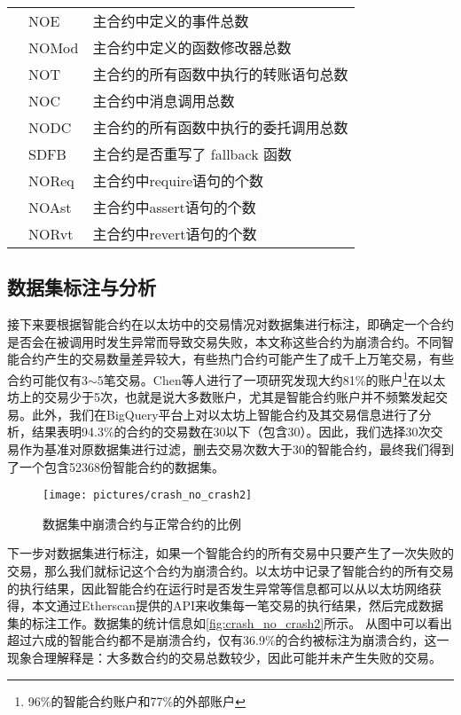 \begin{table}[htbp]
\begin{tabularx}{\linewidth}{cp{3.5cm}<{\centering}X<{\raggedright}}
                                       & NOE                 & 主合约中定义的事件总数 \\
                                       & NOMod               &  主合约中定义的函数修改器总数 \\
                                       & NOT                 & 主合约的所有函数中执行的转账语句总数 \\
                                       & NOC                 & 主合约中消息调用总数 \\
                                       & NODC                & 主合约的所有函数中执行的委托调用总数 \\
                                       & SDFB                & 主合约是否重写了 fallback 函数 \\ 
                                       & NOReq         & 主合约中require语句的个数 \\
                                       & NOAst         & 主合约中assert语句的个数 \\
                                       & NORvt         & 主合约中revert语句的个数 \\ \hline
        \end{tabularx}
\end{table}
\subsection{数据集标注与分析}
接下来要根据智能合约在以太坊中的交易情况对数据集进行标注，即确定一个合约是否会在被调用时发生异常而导致交易失败，本文称这些合约为崩溃合约。不同智能合约产生的交易数量差异较大，有些热门合约可能产生了成千上万笔交易，有些合约可能仅有3$\sim$5笔交易。Chen等人进行了一项研究\cite{chen2020understand}发现大约81\%的账户\footnote{96\%的智能合约账户和77\%的外部账户}在以太坊上的交易少于5次，也就是说大多数账户，尤其是智能合约账户并不频繁发起交易。此外，我们在BigQuery平台上对以太坊上智能合约及其交易信息进行了分析，结果表明94.3\%的合约的交易数在30以下（包含30）。因此，我们选择30次交易作为基准对原数据集进行过滤，删去交易次数大于30的智能合约，最终我们得到了一个包含\num{52368}份智能合约的数据集。
\begin{figure}[htbp]
    \centering
    \texttt{[image: pictures/crash\_no\_crash2]}
    \caption{\label{fig:crash_no_crash2}数据集中崩溃合约与正常合约的比例}
\end{figure}

下一步对数据集进行标注，如果一个智能合约的所有交易中只要产生了一次失败的交易，那么我们就标记这个合约为崩溃合约。以太坊中记录了智能合约的所有交易的执行结果，因此智能合约在运行时是否发生异常等信息都可以从以太坊网络获得，本文通过Etherscan提供的API来收集每一笔交易的执行结果，然后完成数据集的标注工作。数据集的统计信息如\autoref{fig:crash_no_crash2}所示。
从图中可以看出超过六成的智能合约都不是崩溃合约，仅有36.9\%的合约被标注为崩溃合约，这一现象合理解释是：大多数合约的交易总数较少，因此可能并未产生失败的交易。




